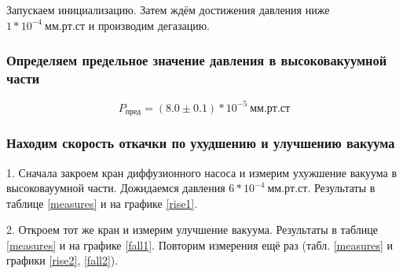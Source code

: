\documentclass[a4paper, 12pt]{article}
\begin{document}
            Запускаем инициализацию. Затем ждём достижения давления ниже $ 1*10^{-4}~мм.рт.ст$ и производим дегазацию.

        \subsubsection{Определяем предельное значение давления в высоковакуумной части}

            $$ P_{пред} = (8.0 \pm 0.1)*10^{-5}~мм.рт.ст $$

        \subsubsection{Находим скорость откачки по ухудшению и улучшению вакуума}

            1. Сначала закроем кран диффузионного насоса и измерим ухужшение вакуума в высоковауумной части. Дожидаемся давления $6*10^{-4}~мм.рт.ст$. Результаты в таблице \ref{measures} и на графике \ref{rise1}.

            2. Откроем тот же кран и измерим улучшение вакуума. Результаты в таблице \ref{measures} и на графике \ref{fall1}. Повторим измерения ещё раз (табл. \ref{measures} и графики \ref{rise2}, \ref{fall2}).
\end{document}
